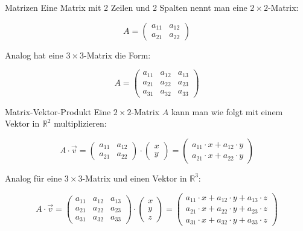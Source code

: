 \begin{definition}
    {Matrizen}{}
    Eine Matrix mit 2 Zeilen und 2 Spalten nennt man eine \( 2 \times 2 \)-Matrix:

\[
A =
\begin{pmatrix} 
a_{11} & a_{12} \\ 
a_{21} & a_{22} 
\end{pmatrix}
\]

Analog hat eine \( 3 \times 3 \)-Matrix die Form:

\[
A =
\begin{pmatrix} 
a_{11} & a_{12} & a_{13} \\ 
a_{21} & a_{22} & a_{23} \\ 
a_{31} & a_{32} & a_{33} 
\end{pmatrix}
\]

\end{definition}
\begin{definition}
    {Matrix-Vektor-Produkt}{}
    Eine \( 2 \times 2 \)-Matrix \( A \) kann man wie folgt mit einem Vektor in \( \mathbb{R}^2 \) multiplizieren:

\[
A \cdot \vec{v} =
\begin{pmatrix} 
a_{11} & a_{12} \\ 
a_{21} & a_{22} 
\end{pmatrix}
\cdot
\begin{pmatrix} x \\ y \end{pmatrix}
=
\begin{pmatrix} 
a_{11} \cdot x + a_{12} \cdot y \\ 
a_{21} \cdot x + a_{22} \cdot y 
\end{pmatrix}
\]

Analog für eine \( 3 \times 3 \)-Matrix und einen Vektor in \( \mathbb{R}^3 \):

\[
A \cdot \vec{v} =
\begin{pmatrix} 
a_{11} & a_{12} & a_{13} \\ 
a_{21} & a_{22} & a_{23} \\ 
a_{31} & a_{32} & a_{33} 
\end{pmatrix}
\cdot
\begin{pmatrix} x \\ y \\ z \end{pmatrix}
=
\begin{pmatrix} 
a_{11} \cdot x + a_{12} \cdot y + a_{13} \cdot z \\ 
a_{21} \cdot x + a_{22} \cdot y + a_{23} \cdot z \\ 
a_{31} \cdot x + a_{32} \cdot y + a_{33} \cdot z 
\end{pmatrix}
\]

\end{definition}
